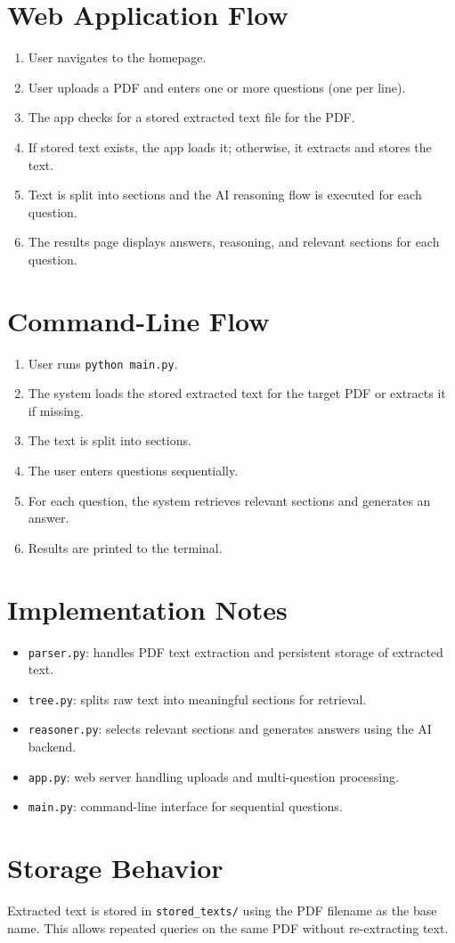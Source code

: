 \documentclass[12pt]{article}
\begin{document}
\section{Web Application Flow}
\begin{enumerate}
    \item User navigates to the homepage.
    \item User uploads a PDF and enters one or more questions (one per line).
    \item The app checks for a stored extracted text file for the PDF.
    \item If stored text exists, the app loads it; otherwise, it extracts and stores the text.
    \item Text is split into sections and the AI reasoning flow is executed for each question.
    \item The results page displays answers, reasoning, and relevant sections for each question.
\end{enumerate}

\section{Command-Line Flow}
\begin{enumerate}
    \item User runs \texttt{python main.py}.
    \item The system loads the stored extracted text for the target PDF or extracts it if missing.
    \item The text is split into sections.
    \item The user enters questions sequentially.
    \item For each question, the system retrieves relevant sections and generates an answer.
    \item Results are printed to the terminal.
\end{enumerate}

\section{Implementation Notes}
\begin{itemize}
    \item \texttt{parser.py}: handles PDF text extraction and persistent storage of extracted text.
    \item \texttt{tree.py}: splits raw text into meaningful sections for retrieval.
    \item \texttt{reasoner.py}: selects relevant sections and generates answers using the AI backend.
    \item \texttt{app.py}: web server handling uploads and multi-question processing.
    \item \texttt{main.py}: command-line interface for sequential questions.
\end{itemize}

\section{Storage Behavior}
Extracted text is stored in \texttt{stored\_texts/} using the PDF filename as the base name. This allows repeated queries on the same PDF without re-extracting text.
\end{document}
